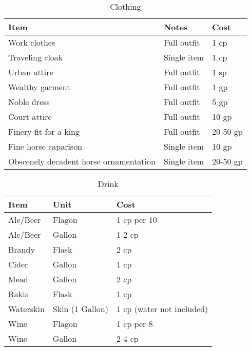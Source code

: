 \documentclass[oneside,11pt,english]{book}
\begin{document}
\begin{table}[hb]
  \centering
  \caption{Clothing}
  \label{tab:Clothing}
  \begin{tabu} spread 0pt {*{3}{X[-1]}}
    Item                                   & Notes       & Cost     \\\toprule
    Work clothes                           & Full outfit & 1 cp     \\
    Traveling cloak                        & Single item & 1 cp     \\
    Urban attire                           & Full outfit & 1 sp     \\
    Wealthy garment                        & Full outfit & 1 gp     \\
    Noble dress                            & Full outfit & 5 gp     \\
    Court attire                           & Full outfit & 10 gp    \\
    Finery fit for a king                  & Full outfit & 20-50 gp \\
    Fine horse caparison                   & Single item & 10 gp    \\
    Obscenely decadent horse ornamentation & Single item & 20-50 gp \\
  \end{tabu}
\end{table}

\begin{table}[hb]
  \centering
  \caption{Drink}
  \label{tab:Drink}
  \begin{tabu} spread 0pt {*{3}{X[-1]}}
    Item      & Unit            & Cost                      \\\toprule
    Ale/Beer  & Flagon          & 1 cp per 10               \\
    Ale/Beer  & Gallon          & 1-2 cp                    \\
    Brandy    & Flask           & 2 cp                      \\
    Cider     & Gallon          & 1 cp                      \\
    Mead      & Gallon          & 2 cp                      \\
    Rakia     & Flask           & 1 cp                      \\
    Waterskin & Skin (1 Gallon) & 1 cp (water not included) \\
    Wine      & Flagon          & 1 cp per 8                \\
    Wine      & Gallon          & 2-4 cp                    \\
  \end{tabu}
\end{table}
\end{document}
